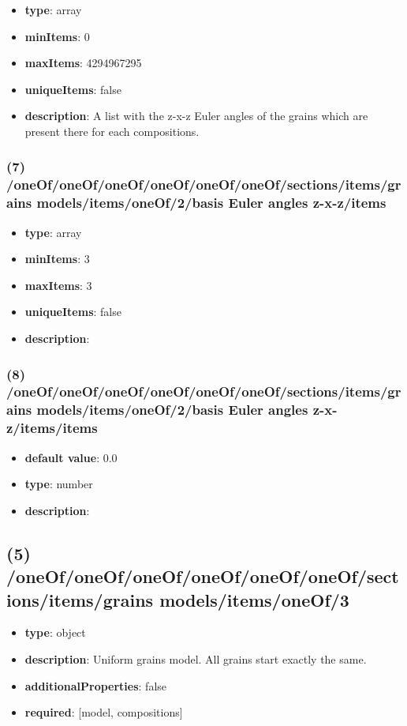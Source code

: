 \begin{itemize}[leftmargin=6em]\item {\bf type}: array
\item {\bf minItems}: 0
\item {\bf maxItems}: 4294967295
\item {\bf uniqueItems}: false
\item {\bf description}: A list with the z-x-z Euler angles of the grains which are present there for each compositions.
\end{itemize}\subsubsection{(7) /oneOf/oneOf/oneOf/oneOf/oneOf/oneOf/sections/items/grains models/items/oneOf/2/basis Euler angles z-x-z/items}
\begin{itemize}[leftmargin=7em]\item {\bf type}: array
\item {\bf minItems}: 3
\item {\bf maxItems}: 3
\item {\bf uniqueItems}: false
\item {\bf description}: 
\end{itemize}\subsubsection{(8) /oneOf/oneOf/oneOf/oneOf/oneOf/oneOf/sections/items/grains models/items/oneOf/2/basis Euler angles z-x-z/items/items}
\begin{itemize}[leftmargin=8em]\item {\bf default value}: 0.0
\item {\bf type}: number
\item {\bf description}: 
\end{itemize}\subsection{(5) /oneOf/oneOf/oneOf/oneOf/oneOf/oneOf/sections/items/grains models/items/oneOf/3}
\begin{itemize}[leftmargin=5em]\item {\bf type}: object
\item {\bf description}: Uniform grains model. All grains start exactly the same.
\item {\bf additionalProperties}: false
\item {\bf required}: [model, compositions]\end{itemize}
